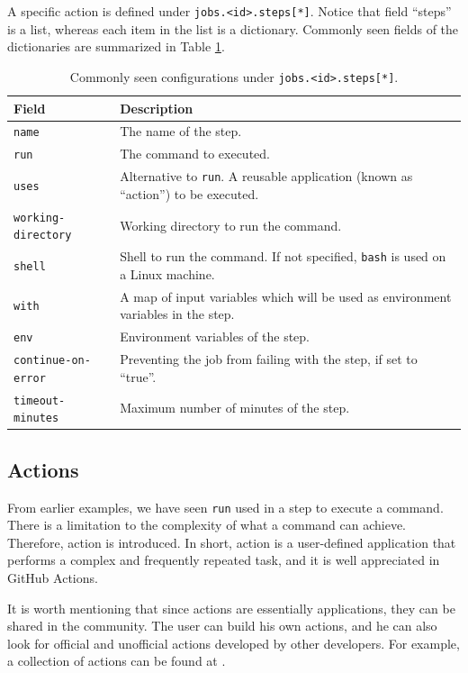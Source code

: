 A specific action is defined under \texttt{jobs.<id>.steps[*]}. Notice that field ``steps'' is a list, whereas each item in the list is a dictionary. Commonly seen fields of the dictionaries are summarized in Table \ref{tab:githubactions_steps}.
\begin{table}[!htb]
	\centering \caption{Commonly seen configurations under \texttt{jobs.<id>.steps[*]}.}\label{tab:githubactions_steps}
	\begin{tabularx}{\textwidth}{lX}
		\hline
		Field & Description \\ \hline
		\texttt{name} & The name of the step. \\ 
        \texttt{run} & The command to executed. \\
        \texttt{uses} & Alternative to \texttt{run}. A reusable application (known as ``action'') to be executed. \\
        \texttt{working-directory} & Working directory to run the command. \\
        \texttt{shell} & Shell to run the command. If not specified, \texttt{bash} is used on a Linux machine. \\
        \texttt{with} & A map of input variables which will be used as environment variables in the step. \\
        \texttt{env} & Environment variables of the step. \\
        \texttt{continue-on-error} & Preventing the job from failing with the step, if set to ``true''. \\
        \texttt{timeout-minutes} & Maximum number of minutes of the step. \\
		\hline
	\end{tabularx}
\end{table}

\subsection{Actions}

From earlier examples, we have seen \verb|run| used in a step to execute a command. There is a limitation to the complexity of what a command can achieve. Therefore, action is introduced. In short, action is a user-defined application that performs a complex and frequently repeated task, and it is well appreciated in GitHub Actions.

It is worth mentioning that since actions are essentially applications, they can be shared in the community. The user can build his own actions, and he can also look for official and unofficial actions developed by other developers. For example, a collection of actions can be found at \cite{git2025actions}.

